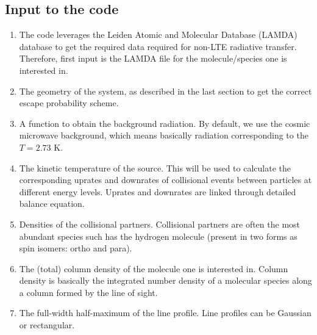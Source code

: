 \documentclass{article}
\begin{document}
\subsection{Input to the code}
\begin{enumerate}
    \item The code leverages the Leiden Atomic and Molecular Database (LAMDA)
    database to get the required data required for non-LTE radiative transfer.
    Therefore, first input is the LAMDA file for the molecule/species one is interested
    in.
    \item The geometry of the system, as described in the last section to get the
    correct escape probability scheme.
    \item A function to obtain the background radiation. By default, we use
    the cosmic microwave background, which means basically radiation corresponding
    to the \(T = 2.73\) K.
    \item The kinetic temperature of the source. This will be used to calculate the
    corresponding uprates and downrates of collisional events between particles at
    different energy levels. Uprates and downrates are linked through detailed
    balance equation.
    \item Densities of the collisional partners. Collisional partners are often
    the most abundant species such has the hydrogen molecule (present in two forms
    as spin isomers: ortho and para).
    \item The (total) column density of the molecule one is interested in. Column density
    is basically the integrated number density of a molecular species along a column
    formed by the line of sight.
    \item The full-width half-maximum of the line profile. Line profiles can be Gaussian
    or rectangular.
\end{enumerate}
\end{document}
